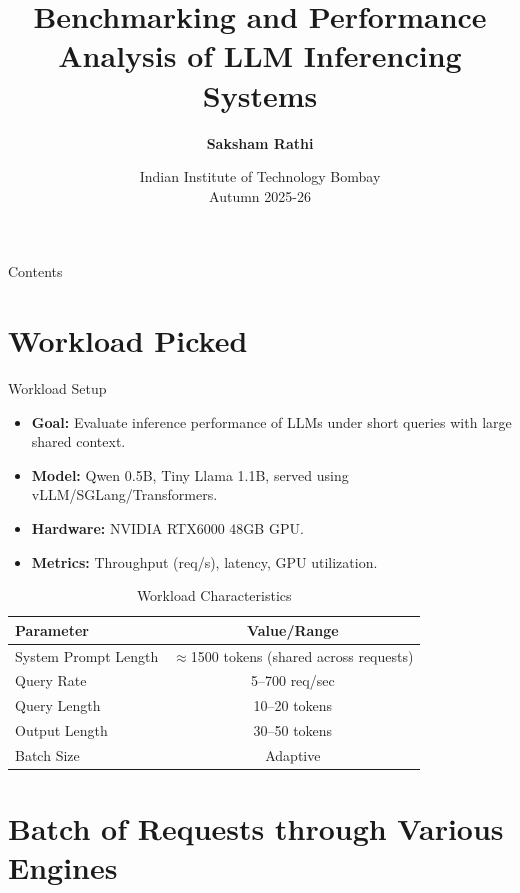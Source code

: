 \documentclass[Serif, 10pt, brown]{beamer}
\title[{Systems for LLMs}]{\sc Benchmarking and Performance Analysis of LLM Inferencing Systems}
\author[\ul{Authors}]{{\textbf{Saksham Rathi}}}
\institute[UTD]{\sc\small Systems for LLMs\\ Under Prof. Mythili Vutukuru}
\date[UCI]{Indian Institute of Technology Bombay \\ Autumn 2025-26}
\theoremstyle{example}
\theoremstyle{plain}
\begin{document}
\frame{\titlepage}

\begin{frame}{Contents}
	\tableofcontents
\end{frame}

\section{Workload Picked}

\begin{frame}{Workload Setup}
\begin{itemize}
    \item \textbf{Goal:} Evaluate inference performance of LLMs under short queries with large shared context.
    \item \textbf{Model:} Qwen 0.5B, Tiny Llama 1.1B, served using vLLM/SGLang/Transformers.
    \item \textbf{Hardware:} NVIDIA RTX6000 48GB GPU.
    \item \textbf{Metrics:} Throughput (req/s), latency, GPU utilization.
\end{itemize}

\begin{table}[h!]
\centering
\scriptsize
\begin{tabular}{|l|c|}
\hline
\textbf{Parameter} & \textbf{Value/Range} \\
\hline
System Prompt Length & $\approx$1500 tokens (shared across requests) \\
Query Rate & 5–700 req/sec \\
Query Length & 10–20 tokens \\
Output Length & 30–50 tokens \\
Batch Size & Adaptive \\
\hline
\end{tabular}
\caption{Workload Characteristics}
\end{table}
\end{frame}


\section{Batch of Requests through Various Engines}
\end{document}
